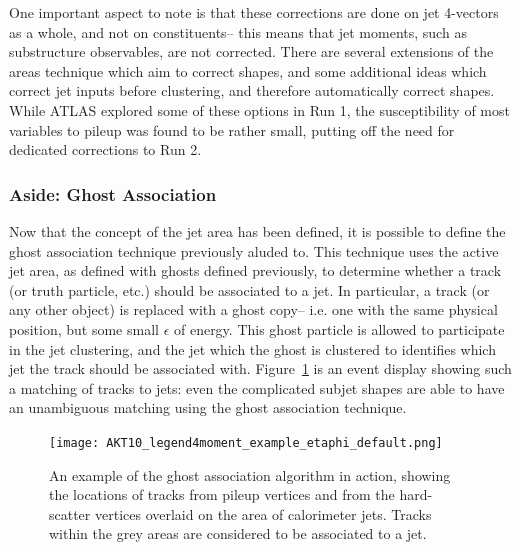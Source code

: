 One important aspect to note is that these corrections are done on jet 4-vectors as a whole, and not on constituents-- this means that jet moments, such as substructure observables, are not corrected. There are several extensions of the areas technique which aim to correct shapes, and some additional ideas which correct jet inputs before clustering, and therefore automatically correct shapes. While ATLAS explored some of these options in Run 1, the susceptibility of most variables to pileup was found to be rather small, putting off the need for dedicated corrections to Run 2. 



\subsubsection{Aside: Ghost Association}
\label{jet-reconstruction:pileup:ghost-association}

Now that the concept of the jet area has been defined, it is possible to define the ghost association technique previously aluded to. This technique uses the active jet area, as defined with ghosts defined previously, to determine whether a track (or truth particle, etc.) should be associated to a jet. In particular, a track (or any other object) is replaced with a ghost copy-- i.e. one with the same physical position, but some small $\epsilon$ of energy. This ghost particle is allowed to participate in the jet clustering, and the jet which the ghost is clustered to identifies which jet the track should be associated with. Figure~\ref{fig:jet-reconstruction:ghost} is an event display showing such a matching of tracks to jets: even the complicated subjet shapes are able to have an unambiguous matching using the ghost association technique.



\begin{figure}
\centering
\texttt{[image: AKT10\_legend4moment\_example\_etaphi\_default.png]}
\label{fig:jet-reconstruction:ghost}
\caption{An example of the ghost association algorithm in action, showing the locations of tracks from pileup vertices and from the hard-scatter vertices overlaid on the area of calorimeter jets. Tracks within the grey areas are considered to be associated to a jet.}
\end{figure}




